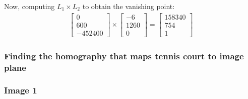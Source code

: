 \documentclass[12pt, oneside]{article}
\begin{document}
    Now, computing $L_1 \times L_2$ to obtain the vanishing point:
    \begin{align*}
        \begin{bmatrix}
            0  \\
            600 \\
            -452400 
        \end{bmatrix}    \times 
        \begin{bmatrix}
            -6  \\
            1260 \\
            0 
        \end{bmatrix}    = 
        \begin{bmatrix}
            158340  \\
            754 \\
            1 
        \end{bmatrix}
    \end{align*}
    
\subsubsection*{Finding the homography that maps tennis court to 
                image plane}

\subsubsection*{Image 1} 
\end{document}
